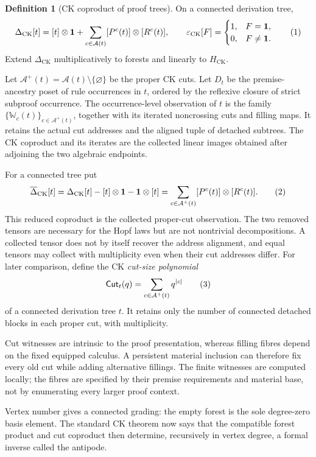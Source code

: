 \documentclass[10pt,a4paper]{article}
\theoremstyle{plain}
\theoremstyle{definition}
\newtheorem{definition}[theorem]{Definition}
\theoremstyle{remark}
\newcommand{\HCK}{H_{\mathrm{CK}}}
\newcommand{\DeltaCK}{\Delta_{\mathrm{CK}}}
\newcommand{\epsCK}{\varepsilon_{\mathrm{CK}}}
\newcommand{\one}{\mathbf 1}
\newcommand{\eqtag}{\refstepcounter{equation}\tag{\theequation}}
\begin{document}
\begin{definition}[CK coproduct of proof trees]
\label{def:ck-coproduct}
On a connected derivation tree,
\[
 \DeltaCK[t]
   =[t]\otimes\one+
     \sum_{c\in\mathcal A(t)}
       [P^c(t)]\otimes[R^c(t)],
\qquad
 \epsCK[F]=
 \begin{cases}
 1,&F=\one,\\
 0,&F\ne\one.
 \end{cases}
\eqtag\label{eq:ck-coproduct}
\]
Extend \(\DeltaCK\) multiplicatively to forests and linearly to
\(\HCK\).
\end{definition}

Let
\(
 \mathcal A^+(t)=\mathcal A(t)\setminus\{\varnothing\}
\)
be the proper CK cuts.  Let \(D_t\) be the premise-ancestry poset of
rule occurrences in \(t\), ordered by the reflexive closure of strict
subproof occurrence.  The occurrence-level observation of \(t\) is the family
\(\{\mathbb W_c(t)\}_{c\in\mathcal A^+(t)}\), together with its iterated
noncrossing cuts and filling maps.  It retains the actual cut addresses
and the aligned tuple of detached subtrees.  The CK coproduct and its
iterates are the
collected linear images obtained after adjoining the two algebraic
endpoints.

For a connected tree put
\[
 \overline\Delta_{\mathrm{CK}}[t]
   =\DeltaCK[t]-[t]\otimes\one-\one\otimes[t]
   =\sum_{c\in\mathcal A^+(t)}
        [P^c(t)]\otimes[R^c(t)] .
\eqtag\label{eq:reduced-ck-coproduct}
\]
This reduced coproduct is the collected proper-cut observation.
The two removed tensors are necessary for the Hopf laws but are not
nontrivial decompositions.  A collected tensor does not by itself recover
the address alignment, and equal tensors may collect with multiplicity even
when their cut addresses differ.
For later comparison, define the CK \emph{cut-size polynomial}
\[
 \mathsf{Cut}_t(q)
   =\sum_{c\in\mathcal A^+(t)}
        q^{|c|}
\eqtag\label{eq:proper-cut-polynomial}
\]
of a connected derivation tree \(t\).  It retains only the number of connected
detached blocks in each proper cut, with multiplicity.

Cut witnesses are intrinsic to the proof presentation, whereas filling
fibres depend on the fixed equipped calculus.  A persistent material inclusion
can therefore fix every old cut while adding alternative fillings.
The finite witnesses are computed locally; the fibres are specified by
their premise requirements and material base, not by enumerating every
larger proof context.

Vertex number gives a connected grading: the empty forest is the sole
degree-zero basis element.  The standard CK theorem now says that the
compatible forest product and cut coproduct then determine, recursively in
vertex degree, a formal inverse called the antipode.
\end{document}
